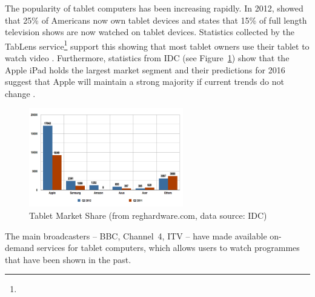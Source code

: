	The popularity of tablet computers has been increasing rapidly. In 2012, \citet{pewResearch} showed that 25\% of Americans now own tablet devices and \citet{viacom} states that 15\% of full length television shows are now watched on tablet devices. Statistics collected by the TabLens service\footnote{} support this showing that most tablet owners use their tablet to watch video \citep{comscore}. Furthermore, statistics from IDC (see Figure~\ref{fig:tablet_market_share}) show that the Apple iPad holds the largest market segment and their predictions for 2016 suggest that Apple will maintain a strong majority if current trends do not change \citep{IDCPredictions}.

	\begin{figure}[htb]
		\centering
			\includegraphics[width=0.6\textwidth]{images/idcTabletMarketShare.png}
		\caption[Caption for LOF]{Tablet Market Share (from reghardware.com\footnotemark, data source: IDC)}
		\label{fig:tablet_market_share}
	\end{figure}


	The main broadcasters -- BBC, Channel~4, ITV -- have made available on-demand services for tablet computers, which allows users to watch programmes that have been shown in the past. %


